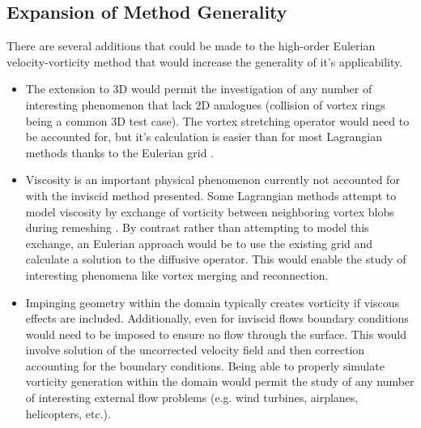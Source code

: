 \documentclass[letterpaper,12pt]{report}
\begin{document}
\subsection{Expansion of Method Generality}
There are several additions that could be made to the high-order Eulerian velocity-vorticity method that would increase the generality of it's applicability.
\begin{itemize}
\item The extension to 3D would permit the investigation of any number of interesting phenomenon that lack 2D analogues (collision of vortex rings \cite{Wee} being a common 3D test case). The vortex stretching operator would need to be accounted for, but it's calculation is easier than for most Lagrangian methods thanks to the Eulerian grid \cite{Saffman1992}.

\item Viscosity is an important physical phenomenon currently not accounted for with the inviscid method presented. Some Lagrangian methods attempt to model viscosity by exchange of vorticity between neighboring vortex blobs during remeshing \cite{HaldReview}. By contrast rather than attempting to model this exchange, an Eulerian approach would be to use the existing grid and calculate a solution to the diffusive operator. This would enable the study of interesting phenomena like vortex merging and reconnection.

\item Impinging geometry within the domain typically creates vorticity if viscous effects are included. Additionally, even for inviscid flows boundary conditions would need to be imposed to ensure no flow through the surface. This would involve solution of the uncorrected velocity field and then correction accounting for the boundary conditions. Being able to properly simulate vorticity generation within the domain would permit the study of any number of interesting external flow problems (e.g. wind turbines, airplanes, helicopters, etc.).
\end{itemize}
\end{document}
